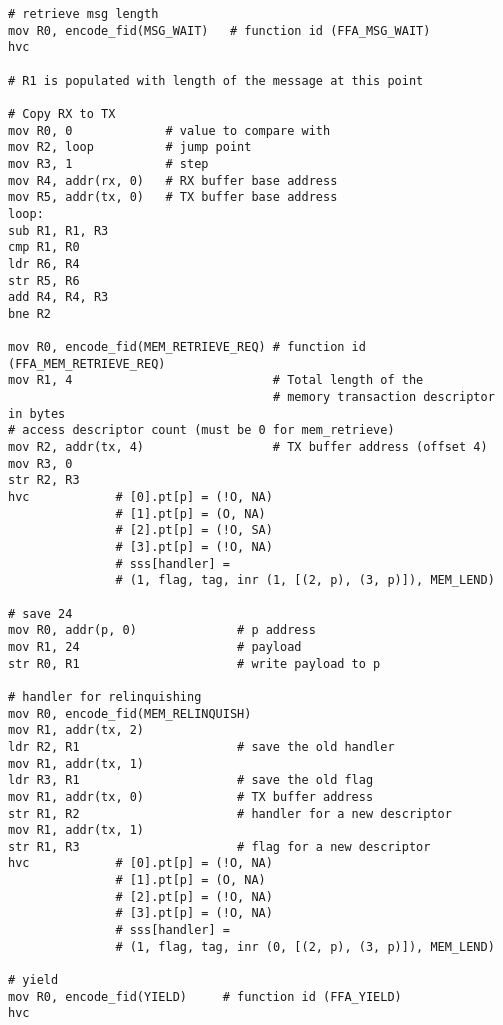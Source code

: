 \documentclass{article}
\begin{document}
\begin{lstlisting}[caption={VM 2}]
# retrieve msg length
mov R0, encode_fid(MSG_WAIT)   # function id (FFA_MSG_WAIT)
hvc

# R1 is populated with length of the message at this point

# Copy RX to TX
mov R0, 0             # value to compare with
mov R2, loop          # jump point
mov R3, 1             # step
mov R4, addr(rx, 0)   # RX buffer base address
mov R5, addr(tx, 0)   # TX buffer base address
loop:
sub R1, R1, R3
cmp R1, R0
ldr R6, R4
str R5, R6
add R4, R4, R3
bne R2

mov R0, encode_fid(MEM_RETRIEVE_REQ) # function id (FFA_MEM_RETRIEVE_REQ)
mov R1, 4                            # Total length of the  
                                     # memory transaction descriptor in bytes
# access descriptor count (must be 0 for mem_retrieve)
mov R2, addr(tx, 4)                  # TX buffer address (offset 4)
mov R3, 0
str R2, R3                                    
hvc            # [0].pt[p] = (!O, NA)
               # [1].pt[p] = (O, NA)
               # [2].pt[p] = (!O, SA)
               # [3].pt[p] = (!O, NA)
               # sss[handler] = 
               # (1, flag, tag, inr (1, [(2, p), (3, p)]), MEM_LEND)

# save 24
mov R0, addr(p, 0)              # p address
mov R1, 24                      # payload
str R0, R1                      # write payload to p

# handler for relinquishing
mov R0, encode_fid(MEM_RELINQUISH)
mov R1, addr(tx, 2)
ldr R2, R1                      # save the old handler
mov R1, addr(tx, 1)
ldr R3, R1                      # save the old flag
mov R1, addr(tx, 0)             # TX buffer address
str R1, R2                      # handler for a new descriptor
mov R1, addr(tx, 1)
str R1, R3                      # flag for a new descriptor
hvc            # [0].pt[p] = (!O, NA)
               # [1].pt[p] = (O, NA)
               # [2].pt[p] = (!O, NA)
               # [3].pt[p] = (!O, NA)
               # sss[handler] = 
               # (1, flag, tag, inr (0, [(2, p), (3, p)]), MEM_LEND)

# yield
mov R0, encode_fid(YIELD)     # function id (FFA_YIELD)
hvc
\end{lstlisting}
\end{document}
